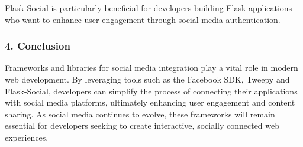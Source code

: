 Flask-Social is particularly beneficial for developers building Flask applications who want to enhance user engagement through social media authentication.

\begin{comment}
\subsubsection{4. Next.js and Social Media APIs}

Next.js is a popular React framework that enables server-side rendering and static site generation. While it is primarily focused on enhancing performance and SEO, it also provides excellent capabilities for integrating social media APIs into web applications.

Key features of Next.js for social media integration include:
\begin{itemize}
    \item \textbf{API Routes}: Next.js allows developers to create API routes that can handle requests to social media APIs, making it easier to fetch or send data without setting up a separate server.
    \item \textbf{Dynamic Content}: Supports dynamic rendering of social media content, enabling developers to display the latest tweets, posts, or shares directly on their web pages.
    \item \textbf{SEO Benefits}: With server-side rendering, Next.js enhances the discoverability of shared content on social media platforms by ensuring that metadata is available when crawlers access the page.
\end{itemize}

Next.js provides a robust framework for developers looking to build fast, engaging web applications that effectively integrate social media functionalities.
\end{comment}

\subsubsection{4. Conclusion}

Frameworks and libraries for social media integration play a vital role in modern web development. By leveraging tools such as the Facebook SDK, Tweepy and Flask-Social, developers can simplify the process of connecting their applications with social media platforms, ultimately enhancing user engagement and content sharing. As social media continues to evolve, these frameworks will remain essential for developers seeking to create interactive, socially connected web experiences.

